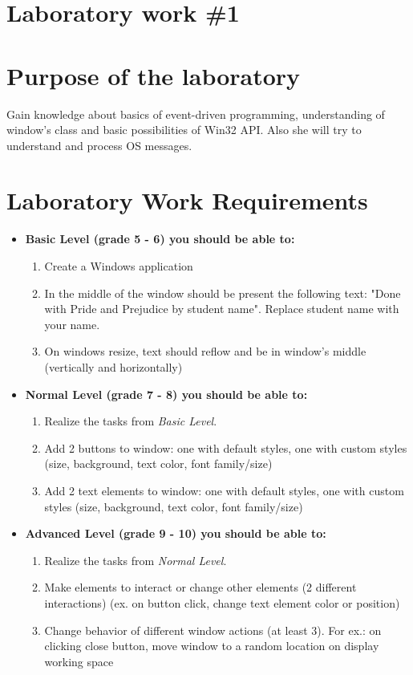 \section*{Laboratory work \#1}

\section{Purpose of the laboratory}
Gain knowledge about basics of event-driven programming, understanding of window’s class and basic possibilities of Win32 API. Also she will try to understand and process OS messages.
\section{Laboratory Work Requirements}
\begin{itemize}
\item \textbf{Basic Level (grade 5 - 6) you should be able to:}
	\begin{enumerate}
	\item Create a Windows application
      \item In the middle of the window should be present the following text: "Done with Pride and Prejudice by student name". Replace student name with your name.
      \item On windows resize, text should reflow and be in window's middle (vertically and horizontally)
      \end{enumerate}
\item \textbf{Normal Level (grade 7 - 8) you should be able to:}
      \begin{enumerate}
    \item Realize the tasks from \textit{Basic Level}.
    \item Add 2 buttons to window: one with default styles, one with custom styles (size, background, text color, font family/size)
    \item Add 2 text elements to window: one with default styles, one with custom styles (size, background, text color, font family/size)
          \end{enumerate}
\item \textbf{Advanced Level (grade 9 - 10) you should be able to:}
      \begin{enumerate}
    \item Realize the tasks from \textit{Normal Level}.
    \item Make elements to interact or change other elements (2 different interactions)  (ex. on button click, change text element color or position)
    \item Change behavior of different window actions (at least 3). For ex.: on clicking close button, move window to a random location on display working space 
          \end{enumerate}
  \end{itemize}  

\clearpage